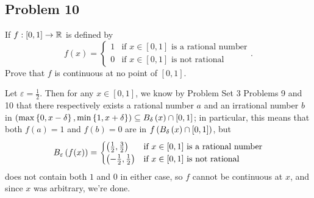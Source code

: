 \documentclass[main.tex]{subfiles}
\begin{document}
\subsection{Problem 10}
\begin{claim}
    If $f : [0, 1]\to \mathbb R$ is defined by
    \[f(x) = \begin{cases}
        1 & \text{if }x\in[0, 1]\text{ is a rational number} \\
        0 & \text{if }x\in[0, 1]\text{ is not rational}
    \end{cases}.\]
    Prove that $f$ is continuous at no point of $[0, 1]$.
\end{claim}

\begin{soln}
    Let $\varepsilon = \frac{1}{2}$. Then for any $x \in [0, 1]$, we know by Problem Set 3 Problems 9 and 10 that there respectively exists a rational number $a$ and an irrational number $b$ in $\left( \max\left\{ 0, x - \delta \right\}, \min\left\{ 1, x + \delta \right\} \right)\subseteq B_\delta\left( x \right)\cap [0, 1] $; in particular, this means that both $f(a) = 1$ and $f(b) = 0$ are in $f\left( B_\delta\left( x \right)\cap [0, 1] \right)$, but
    \[B_\varepsilon\left( f(x) \right) = \begin{cases}
        \left( \frac{1}{2}, \frac{3}{2} \right) & \text{if }x\in[0, 1]\text{ is a rational number} \\
        \left( -\frac{1}{2}, \frac{1}{2} \right) & \text{if }x\in[0, 1]\text{ is not rational}
    \end{cases}\]
    does not contain both $1$ and $0$ in either case, so $f$ cannot be continuous at $x$, and since $x$ was arbitrary, we're done.
\end{soln}
\eject
\end{document}
